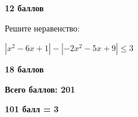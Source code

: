 \begin{flushright} \textbf{12 баллов}\\ 
\end{flushright}

 Решите неравенство:

$\left|x^{2}-6x+1\right|-\left|-2x^{2}-5x+9\right|\le3$

\begin{flushright} \textbf{18 баллов}\\ 
\end{flushright}

\centerline{\bf }


\centerline{\bf  Всего баллов: 201}
\centerline{\bf  101 балл = 3}



